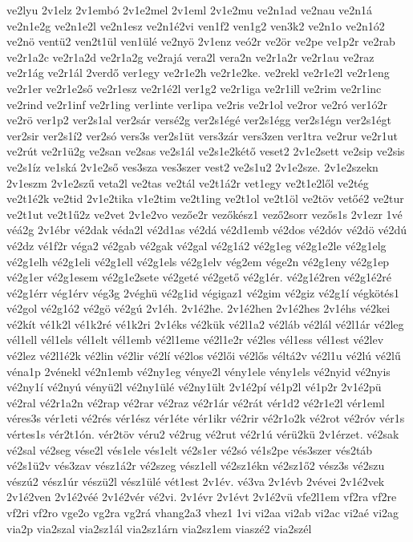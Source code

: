 {ve2lyu
2v1elz
2v1embó
2v1e2mel
2v1eml
2v1e2mu
ve2n1ad
ve2nau
ve2n1á
ve2n1e2g
ve2n1e2l
ve2n1esz
ve2n1é2vi
ven1f2
ven1g2
ven3k2
ve2n1o
ve2n1ó2
ve2nö
ventü2
ven2t1ül
ven1ülé
ve2nyö
2v1enz
veó2r
ve2ör
ve2pe
ve1p2r
ve2rab
ve2r1a2c
ve2r1a2d
ve2r1a2g
ve2rajá
vera2l
vera2n
ve2r1a2r
ve2r1au
ve2raz
ve2r1ág
ve2r1ál
2verdő
ver1egy
ve2r1e2h
ve2r1e2ke.
ve2rekl
ve2r1e2l
ve2r1eng
ve2r1er
ve2r1e2ső
ve2r1esz
ve2r1é2l
ver1g2
ve2r1iga
ve2r1ill
ve2rim
ve2r1inc
ve2rind
ve2r1inf
ve2r1ing
ver1inte
ver1ipa
ve2ris
ve2r1ol
ve2ror
ve2ró
ver1ó2r
ve2rö
ver1p2
ver2s1al
ver2sár
versé2g
ver2s1égé
ver2s1égg
ver2s1égn
ver2s1égt
ver2sir
ver2s1í2
ver2só
vers3s
ver2s1üt
vers3zár
vers3zen
ver1tra
ve2rur
ve2r1ut
ve2rút
ve2r1ü2g
ve2san
ve2sas
ve2s1ál
ve2s1e2kétő
veset2
2v1e2sett
ve2sip
ve2sis
ve2s1íz
ve1ská
2v1e2ső
ves3sza
ves3szer
vest2
ve2s1u2
2v1e2sze.
2v1e2szekn
2v1eszm
2v1e2szű
veta2l
ve2tas
ve2tál
ve2t1á2r
vet1egy
ve2t1e2lől
ve2tég
ve2t1é2k
ve2tid
2v1e2tika
v1e2tim
ve2t1ing
ve2t1ol
ve2t1öl
ve2töv
vetőé2
ve2tur
ve2t1ut
ve2t1ű2z
ve2vet
2v1e2vo
vezőe2r
vezőkész1
vező2sorr
vezős1s
2v1ezr
1vé
véá2g
2v1ébr
vé2dak
véda2l
vé2d1as
vé2dá
vé2d1emb
vé2dos
vé2dóv
vé2dö
vé2dú
vé2dz
vé1f2r
véga2
vé2gab
vé2gak
vé2gal
vé2g1á2
vé2g1eg
vé2g1e2le
vé2g1elg
vé2g1elh
vé2g1eli
vé2g1ell
vé2g1els
vé2g1elv
vég2em
vége2n
vé2g1eny
vé2g1ep
vé2g1er
vé2g1esem
vé2g1e2sete
vé2geté
vé2gető
vé2g1ér.
vé2g1é2ren
vé2g1é2ré
vé2g1érr
vég1érv
vég3g
2véghü
vé2g1id
végigaz1
vé2gim
vé2giz
vé2g1í
végkötés1
vé2gol
vé2g1ó2
vé2gö
vé2gú
2v1éh.
2v1é2he.
2v1é2hen
2v1é2hes
2v1éhs
vé2kei
vé2kít
vé1k2l
vé1k2ré
vé1k2ri
2v1éks
vé2kük
vé2l1a2
vé2láb
vé2lál
vé2l1ár
vé2leg
vél1ell
vél1els
vél1elt
vél1emb
vé2l1eme
vé2l1e2r
vé2les
vél1ess
vél1est
vé2lev
vé2lez
vé2l1é2k
vé2lin
vé2lir
vé2lí
vé2los
vé2lői
vé2lős
véltá2v
vé2l1u
vé2lú
vé2lű
véna1p
2vénekl
vé2n1emb
vé2ny1eg
vénye2l
vény1ele
vény1els
vé2nyid
vé2nyis
vé2ny1í
vé2nyú
vényü2l
vé2ny1ülé
vé2ny1ült
2v1é2pí
vé1p2l
vé1p2r
2v1é2pü
vé2ral
vé2r1a2n
vé2rap
vé2rar
vé2raz
vé2r1ár
vé2rát
vér1d2
vé2r1e2l
vér1eml
véres3s
vér1eti
vé2rés
vér1ész
vér1éte
vér1ikr
vé2rir
vé2r1o2k
vé2rot
vé2róv
vér1s
vértes1s
vér2t1ón.
vér2töv
véru2
vé2rug
vé2rut
vé2r1ú
vérü2kü
2v1érzet.
vé2sak
vé2sal
vé2seg
vése2l
vés1ele
vés1elt
vé2s1er
vé2só
vé1s2pe
vés3szer
vés2táb
vé2s1ü2v
vés3zav
vész1á2r
vé2szeg
vész1ell
vé2sz1ékn
vé2sz1ő2
vész3s
vé2szu
vészú2
vész1úr
vészü2l
vész1ülé
vét1est
2v1év.
vé3va
2v1évb
2vévei
2v1é2vek
2v1é2ven
2v1é2véé
2v1é2vér
vé2vi.
2v1évr
2v1évt
2v1é2vü
vfe2l1em
vf2ra
vf2re
vf2ri
vf2ro
vge2o
vg2ra
vg2rá
vhang2a3
vhez1
1vi
vi2aa
vi2ab
vi2ac
vi2aé
vi2ag
via2p
via2szal
via2sz1ál
via2sz1árn
via2sz1em
viaszé2
via2szél
}
